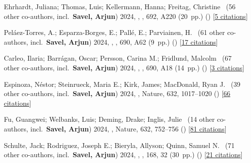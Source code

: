 \item[{\color{numcolor}\scriptsize34}] Ehrhardt, Juliana; Thomas, Luis; Kellermann, Hanna; Freitag, Christine \etal{}\ ({56} other co-authors, incl.\ \textbf{Savel, Arjun}) 2024, , \aanda, {692}, A220 (20~pp.) () [\href{https://ui.adsabs.harvard.edu/abs/2024A&A...692A.220E}{5 citations}]

\item[{\color{numcolor}\scriptsize33}] Pel{\'a}ez-Torres, A.; Esparza-Borges, E.; Pall{\'e}, E.; Parviainen, H. \etal{}\ ({61} other co-authors, incl.\ \textbf{Savel, Arjun}) 2024, , \aanda, {690}, A62 (9~pp.) () [\href{https://ui.adsabs.harvard.edu/abs/2024A&A...690A..62P}{17 citations}]

\item[{\color{numcolor}\scriptsize32}] Carleo, Ilaria; Barr{\'a}gan, Oscar; Persson, Carina M.; Fridlund, Malcolm \etal{}\ ({67} other co-authors, incl.\ \textbf{Savel, Arjun}) 2024, , \aanda, {690}, A18 (14~pp.) () [\href{https://ui.adsabs.harvard.edu/abs/2024A&A...690A..18C}{3 citations}]

\item[{\color{numcolor}\scriptsize31}] Espinoza, N{\'e}stor; Steinrueck, Maria E.; Kirk, James; MacDonald, Ryan J. \etal{}\ ({39} other co-authors, incl.\ \textbf{Savel, Arjun}) 2024, , Nature, {632}, 1017--1020 () [\href{https://ui.adsabs.harvard.edu/abs/2024Natur.632.1017E}{66 citations}]

\item[{\color{numcolor}\scriptsize30}] Fu, Guangwei; Welbanks, Luis; Deming, Drake; Inglis, Julie \etal{}\ ({14} other co-authors, incl.\ \textbf{Savel, Arjun}) 2024, , Nature, {632}, 752--756 () [\href{https://ui.adsabs.harvard.edu/abs/2024Natur.632..752F}{81 citations}]

\item[{\color{numcolor}\scriptsize29}] Schulte, Jack; Rodriguez, Joseph E.; Bieryla, Allyson; Quinn, Samuel N. \etal{}\ ({71} other co-authors, incl.\ \textbf{Savel, Arjun}) 2024, , \aj, {168}, 32 (30~pp.) () [\href{https://ui.adsabs.harvard.edu/abs/2024AJ....168...32S}{21 citations}]

